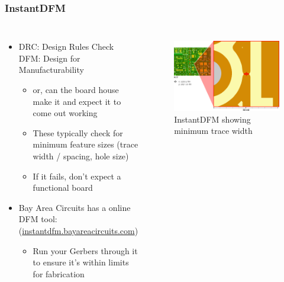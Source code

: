 \documentclass{beamer}
\begin{document}
\begin{frame}
\frametitle{InstantDFM}
\begin{columns}[t]
\begin{itemize}
  \item DRC: Design Rules Check \\
  DFM: Design for Manufacturability
  \begin{itemize}
    \item or, can the board house make it and expect it to come out working
    \item These typically check for minimum feature sizes (trace width / spacing, hole size)
    \item If it fails, don't expect a functional board
  \end{itemize}
  \item Bay Area Circuits has a online DFM tool: (\url{instantdfm.bayareacircuits.com})
  \begin{itemize}
    \item Run your Gerbers through it to ensure it's within limits for fabrication
  \end{itemize}
\end{itemize}

\begin{figure}
  \centering
  \includegraphics[width=1.0\columnwidth]{images-dis5/refcar-instantdfm} \\
  InstantDFM showing minimum trace width
\end{figure}
\end{columns}
\end{frame}

\end{document}
